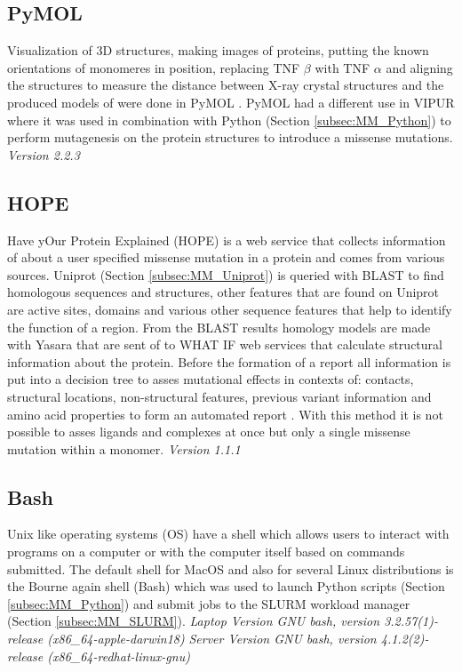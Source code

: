 \subsection{PyMOL}
Visualization of 3D structures, making images of proteins, putting the known orientations of monomeres in position, replacing TNF $\beta$ with TNF $\alpha$ and aligning the structures to measure the distance between X-ray crystal structures and the produced models of were done in PyMOL \cite{}. PyMOL had a different use in VIPUR where it was used in combination with Python (Section \ref{subsec:MM_Python}) to perform mutagenesis on the protein structures to introduce a missense mutations.
\label{subsec:MM_PyMOL}
\newline
\textit{Version 2.2.3}

\subsection{HOPE}
Have yOur Protein Explained (HOPE) is a web service that collects information of about a user specified missense mutation in a protein and comes from various sources. Uniprot (Section \ref{subsec:MM_Uniprot}) is queried with BLAST to find homologous sequences and structures, other features that are found on Uniprot are active sites, domains and various other sequence features that help to identify the function of a region. From the BLAST results homology models are made with Yasara that are sent of to WHAT IF web services that calculate structural information about the protein. Before the formation of a report all information is put into a decision tree to asses mutational effects in contexts of: contacts, structural locations, non-structural features, previous variant information and amino acid properties to form an automated report \cite{}.
With this method it is not possible to asses ligands and complexes at once but only a single missense mutation within a monomer.
\label{subsec:MM_HOPE}
\textit{Version 1.1.1}

\subsection{Bash}
Unix like operating systems (OS) have a shell which allows users to interact with programs on a computer or with the computer itself based on commands submitted.  The default shell for MacOS and also for several Linux distributions is the Bourne again shell (Bash) which was used to launch Python scripts (Section \ref{subsec:MM_Python}) and submit jobs to the SLURM workload manager (Section \ref{subsec:MM_SLURM}). 
\label{subsec:MM_Bash}
\newline
\textit{Laptop Version GNU bash, version 3.2.57(1)-release (x86\_64-apple-darwin18)}
\newline
\textit{Server Version GNU bash, version 4.1.2(2)-release (x86\_64-redhat-linux-gnu)}

